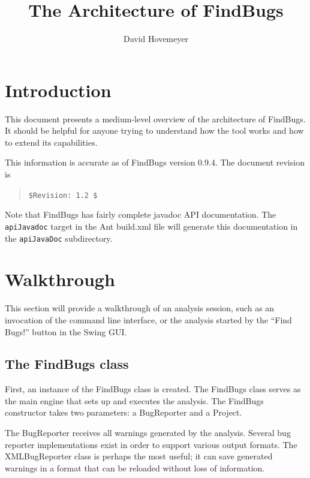 \documentclass[11pt]{article}
\title{The Architecture of FindBugs}
\author{David Hovemeyer}
\date{}
\begin{document}
\maketitle

\section*{Introduction}

This document presents a medium-level overview of the architecture
of FindBugs.  It should be helpful for anyone trying to understand how
the tool works and how to extend its capabilities.

This information is accurate as of FindBugs version 0.9.4.
The document revision is
\begin{quote}
\verb+$Revision: 1.2 $+
\end{quote}

Note that FindBugs has fairly complete javadoc API documentation.
The {\tt apiJavadoc} target in the Ant build.xml file will generate
this documentation in the {\tt apiJavaDoc} subdirectory.

\section{Walkthrough}

This section will provide a walkthrough of an analysis session,
such as an invocation of the command line interface, or the analysis
started by the ``Find Bugs!'' button in the Swing GUI.

\subsection{The FindBugs class}


First, an instance of the FindBugs class is created.
The FindBugs class serves as the main engine that sets up and executes the
analysis.  The FindBugs constructor takes
two parameters: a BugReporter and a Project.

The BugReporter receives all warnings generated by the analysis.
Several bug reporter implementations exist in order to support various
output formats.  The XMLBugReporter class is perhaps the most useful;
it can save generated warnings in a format that can be reloaded without
loss of information.  
\end{document}
